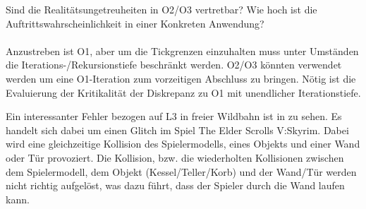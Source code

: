 Sind die Realitätsungetreuheiten in O2/O3 vertretbar? Wie hoch ist die Auftrittswahrscheinlichkeit in einer Konkreten Anwendung?\\
\\
Anzustreben ist O1, aber um die Tickgrenzen einzuhalten muss unter Umständen die Iterations-/Rekursionstiefe beschränkt werden. O2/O3 könnten verwendet werden um eine O1-Iteration zum vorzeitigen Abschluss zu bringen. Nötig ist die Evaluierung der Kritikalität der Diskrepanz zu O1 mit unendlicher Iterationstiefe.
 
Ein interessanter Fehler bezogen auf L3 in freier Wildbahn ist in \cite{skyrimwallglitch} zu sehen. Es handelt sich dabei um einen Glitch im Spiel The Elder Scrolls V:Skyrim. Dabei wird eine gleichzeitige Kollision des Spielermodells, eines Objekts und einer Wand oder Tür provoziert. Die Kollision, bzw. die wiederholten Kollisionen zwischen dem Spielermodell, dem Objekt (Kessel/Teller/Korb) und der Wand/Tür werden nicht richtig aufgelöst, was dazu führt, dass der Spieler durch die Wand laufen kann.


